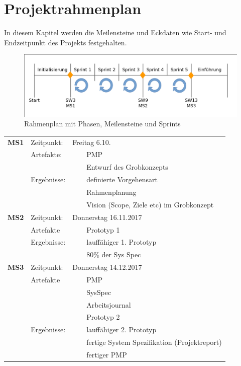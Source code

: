 \documentclass[a4paper, 10pt, fleqn]{article}
\newcommand{\tabitem}{~~\llap{\textbullet}~~}
\begin{document}
    \clearpage
	\section{Projektrahmenplan}
        In diesem Kapitel werden die Meilensteine und Eckdaten wie Start- und Endzeitpunkt des Projekts festgehalten.
        \begin{figure}[H]
            \centering
            \includegraphics[width=\textwidth]{rahmenplan.png}
            \caption{Rahmenplan mit Phasen, Meilensteine und Sprints}
        \end{figure}
        \begin{tabularx}{\textwidth}{lll}
            \textbf{MS1} & Zeitpunkt: & Freitag 6.10.\\
            & Artefakte: & \tabitem PMP\\
            & & \tabitem Entwurf des Grobkonzepts\\
            & Ergebnisse: & \tabitem definierte Vorgehensart\\
            & & \tabitem Rahmenplanung\\
            & & \tabitem Vision (Scope, Ziele etc) im Grobkonzept\\
            \textbf{MS2} & Zeitpunkt: & Donnerstag 16.11.2017\\
            & Artefakte & \tabitem Prototyp 1\\
            & Ergebnisse: & \tabitem lauffähiger 1. Prototyp\\
            & & \tabitem 80\% der Sys Spec\\
            \textbf{MS3} & Zeitpunkt: & Donnerstag 14.12.2017\\
            & Artefakte & \tabitem PMP \\
            & & \tabitem SysSpec \\
            & & \tabitem Arbeitsjournal \\
            & & \tabitem Prototyp 2\\
            & Ergebnisse: & \tabitem lauffähiger 2. Prototyp\\
            & & \tabitem fertige System Spezifikation (Projektreport)\\
            & & \tabitem fertiger PMP\\
        \end{tabularx}
    \clearpage
\end{document}
